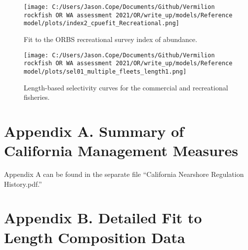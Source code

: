 \documentclass[11pt,
  english,
  a4paper,
]{article}
\begin{document}
\tagmcend\tagstructend


\begin{figure}
\centering
\texttt{[image: C:/Users/Jason.Cope/Documents/Github/Vermilion rockfish OR WA assessment 2021/OR/write\_up/models/Reference model/plots/index2\_cpuefit\_Recreational.png]}
\caption{Fit to the ORBS recreational survey index of abundance.\label{fig:orbs-index-fit}}
\end{figure}

\tagmcend\tagstructend


\begin{figure}
\centering
\texttt{[image: C:/Users/Jason.Cope/Documents/Github/Vermilion rockfish OR WA assessment 2021/OR/write\_up/models/Reference model/plots/sel01\_multiple\_fleets\_length1.png]}
\caption{Length-based selectivity curves for the commercial and recreational fisheries.\label{fig:fleet_selectivity}}
\end{figure}

\tagmcend\tagstructend

\clearpage


\hypertarget{appendix-a.-summary-of-california-management-measures}{%
\section{Appendix A. Summary of California Management Measures}\label{appendix-a.-summary-of-california-management-measures}}

\leavevmode\tagmcend\tagstructend


Appendix A can be found in the separate file ``California Nearshore Regulation History.pdf.''

\leavevmode\tagmcend\tagstructend\par


\hypertarget{appendix-b.-detailed-fit-to-length-composition-data}{%
\section{Appendix B. Detailed Fit to Length Composition Data}\label{appendix-b.-detailed-fit-to-length-composition-data}}
\end{document}
